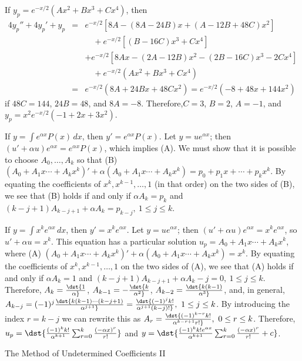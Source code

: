 \documentclass[dvips]{book}
\renewcommand{\exer}[1]{\par\medskip\;\noindent{\color{red}\bf #1.}}
\numberwithin{example}{section}
\numberwithin{equation}{section}
\numberwithin{theorem}{section}
\numberwithin{table}{section}
\numberwithin{figure}{section}
\begin{document}
\exer{5.4.36}
If $y_p=e^{-x/2}(Ax^2+Bx^3+Cx^4)$, then
\begin{eqnarray*}
4y_p''+4y_p'+y_p&=&e^{-x/2}[8A-(8A-24B)x+(A-12B+48C)x^2]\\
 &&\quad+e^{-x/2}[(B-16C)x^3+Cx^4]\\
&&+e^{-x/2}[8Ax-(2A-12B)x^2-(2B-16C)x^3-2Cx^4]\\
&&\quad+e^{-x/2}(Ax^2+Bx^3+Cx^4)\\ &=&e^{-x/2}(8A+24Bx+48Cx^2)=
e^{-x/2}(-8+48x+144x^2)
\end{eqnarray*}
if $48C=144$, $24B=48$, and $8A=-8$. Therefore,$C=3$, $B=2$, $A=-1$,
and $y_p=x^2e^{-x/2}(-1+2x+3x^2)$.


\exer{5.4.38} If $y=\int e^{\alpha x}P(x)\,dx$, then
$y'=e^{\alpha x}P(x)$. Let $y=ue^{\alpha x}$; then $(u'+\alpha
u)e^{\alpha x}=e^{\alpha x}P(x)$, which implies (A). We must show that
it is possible to choose $A_0,\dots,A_k$ so that (B)
$(A_0+A_1x\cdots+A_kx^k)'+\alpha(A_0+A_1x\cdots+A_kx^k)=
p_0+p_1x+\cdots+p_kx^k$. By equating the coefficients of $x^k,
x^{k-1},\dots,1$ (in that order) on the two sides of (B), we see that
(B) holds if and only if $\alpha A_k=p_k$ and $(k-j+1)A_{k-j+1}+\alpha
A_k=p_{k-j},\ 1\le j\le k$.


\exer{5.4.40}
If $y=\int x^ke^{\alpha x}\,dx$, then $y'=x^ke^{\alpha x}$. Let
$y=ue^{\alpha x}$; then $(u'+\alpha u)e^{\alpha x}=x^ke^{\alpha x}$,
so $u'+\alpha u=x^k$. This equation has a
particular solution $u_p=A_0+A_1x\cdots+A_kx^k$, where (A)
$(A_0+A_1x\cdots+A_kx^k)'+\alpha(A_0+A_1x\cdots+A_kx^k)=
x^k$. By equating the coefficients of $x^k,
x^{k-1},\dots,1$  on the two sides of (A), we see that
(A) holds if and only if $\alpha A_k=1$ and
$(k-j+1)A_{k-j+1}+\alpha
A_k-j=0,\ 1\le j\le k$.  Therefore, $A_k=\dst{1\over\alpha}$,
$A_{k-1}=-\dst{k\over\alpha^2}$, $A_{k-2}=\dst{k(k-1)\over\alpha^3}$,
and, in general,
$A_{k-j}=(-1)^j\dst{k(k-1)\cdots(k-j+1)\over\alpha^{j+1}}=
\dst{(-1)^jk!\over\alpha^{j+1}(k-j)!},\
1\le
j\le k$. By introducing the index $r=k-j$ we can rewrite this as
$A_r=\dst{(-1)^{k-r}k!\over\alpha^{k-r+1}r!},\ 0\le r\le k$.
Therefore,
$u_p=\dst{{(-1)^kk!\over \alpha^{k+1}}\sum_{r=0}^k{(-\alpha
x)^r\over r!}}$ and
$y=\dst{{(-1)^kk!e^{\alpha x}\over \alpha^{k+1}}\sum_{r=0}^k{(-\alpha
x)^r\over r!}+c}$.


{The Method of Undetermined Coefficients II}
\renewcommand{\thissection}{}
\thissection
\end{document}
